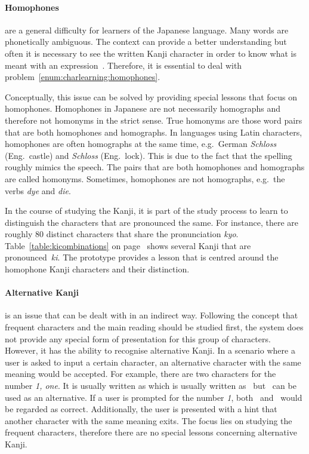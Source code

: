 \paragraph{Homophones} are a general difficulty for learners of the Japanese 
language. Many words are phonetically ambiguous. The context can provide a better
understanding but often it is necessary to see the written Kanji character in 
order to know what is meant with an expression~.
Therefore, it is essential to deal with 
problem~\ref{enum:charlearning:homophones}. 

Conceptually, this issue can be solved by providing special lessons that focus on
homophones. Homophones in Japanese are not necessarily homographs and therefore 
not homonyms in the strict sense. True homonyms are those word pairs that are 
both homophones and homographs. In languages using Latin characters,
homophones are often homographs at the same time, e.g.\ German \emph{Schloss} 
(Eng.\ castle) and \emph{Schloss} (Eng.\ lock). This is due to the fact that
the spelling roughly mimics the speech. The pairs that are both homophones and
homographs are called homonyms. Sometimes, homophones are not homographs, 
e.g.\ the verbs \emph{dye} and \emph{die}.

In the course of studying the Kanji, it is part of the study process to 
learn to distinguish the characters that are pronounced the same.
For instance, there are roughly 80 distinct characters that share the
pronunciation \emph{kyo}. Table~\ref{table:kicombinations} on 
page~\pageref{table:kicombinations} shows several Kanji that are 
pronounced~\emph{ki}. The prototype provides a lesson that is centred around 
the homophone Kanji characters and their distinction.

\paragraph{Alternative Kanji} is an issue that can be dealt with in an indirect
way. Following the concept that frequent characters and the main reading should 
be studied first, the system does not provide any special form of presentation
for this group of characters. However, it has the ability to recognise 
alternative Kanji. In a scenario where a user is asked to input a certain 
character, an alternative character with the same meaning would be accepted. 
For example, there are two characters for the number \emph{1, one}. 
It is usually written as
which is usually written as~ but~ can be used as an alternative.
If a user is prompted for the number \emph{1}, both~ and~ 
would be regarded as correct. Additionally, the user is presented 
with a hint that another character with the same meaning exits. 
The focus lies on studying the frequent characters, therefore there are no 
special lessons concerning alternative Kanji.

